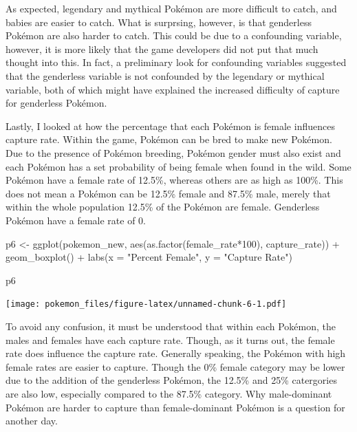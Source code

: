 \documentclass[
]{article}
\newenvironment{Shaded}{\begin{snugshade}}{\end{snugshade}}
\newcommand{\AttributeTok}[1]{\textcolor[rgb]{0.77,0.63,0.00}{#1}}
\newcommand{\DecValTok}[1]{\textcolor[rgb]{0.00,0.00,0.81}{#1}}
\newcommand{\FunctionTok}[1]{\textcolor[rgb]{0.00,0.00,0.00}{#1}}
\newcommand{\NormalTok}[1]{#1}
\newcommand{\OtherTok}[1]{\textcolor[rgb]{0.56,0.35,0.01}{#1}}
\newcommand{\SpecialCharTok}[1]{\textcolor[rgb]{0.00,0.00,0.00}{#1}}
\newcommand{\StringTok}[1]{\textcolor[rgb]{0.31,0.60,0.02}{#1}}
\begin{document}
As expected, legendary and mythical Pokémon are more difficult to catch,
and babies are easier to catch. What is surprsing, however, is that
genderless Pokémon are also harder to catch. This could be due to a
confounding variable, however, it is more likely that the game
developers did not put that much thought into this. In fact, a
preliminary look for confounding variables suggested that the genderless
variable is not confounded by the legendary or mythical variable, both
of which might have explained the increased difficulty of capture for
genderless Pokémon.

Lastly, I looked at how the percentage that each Pokémon is female
influences capture rate. Within the game, Pokémon can be bred to make
new Pokémon. Due to the presence of Pokémon breeding, Pokémon gender
must also exist and each Pokémon has a set probability of being female
when found in the wild. Some Pokémon have a female rate of 12.5\%,
whereas others are as high as 100\%. This does not mean a Pokémon can be
12.5\% female and 87.5\% male, merely that within the whole population
12.5\% of the Pokémon are female. Genderless Pokémon have a female rate
of 0.

\begin{Shaded}
\begin{Highlighting}[]
\NormalTok{p6 }\OtherTok{\textless{}{-}} \FunctionTok{ggplot}\NormalTok{(pokemon\_new, }\FunctionTok{aes}\NormalTok{(}\FunctionTok{as.factor}\NormalTok{(female\_rate}\SpecialCharTok{*}\DecValTok{100}\NormalTok{), capture\_rate)) }\SpecialCharTok{+}
  \FunctionTok{geom\_boxplot}\NormalTok{() }\SpecialCharTok{+}
  \FunctionTok{labs}\NormalTok{(}\AttributeTok{x =} \StringTok{"Percent Female"}\NormalTok{, }\AttributeTok{y =} \StringTok{"Capture Rate"}\NormalTok{)}

\NormalTok{p6}
\end{Highlighting}
\end{Shaded}

\texttt{[image: pokemon\_files/figure-latex/unnamed-chunk-6-1.pdf]}

To avoid any confusion, it must be understood that within each Pokémon,
the males and females have each capture rate. Though, as it turns out,
the female rate does influence the capture rate. Generally speaking, the
Pokémon with high female rates are easier to capture. Though the 0\%
female category may be lower due to the addition of the genderless
Pokémon, the 12.5\% and 25\% catergories are also low, especially
compared to the 87.5\% category. Why male-dominant Pokémon are harder to
capture than female-dominant Pokémon is a question for another day.
\end{document}
